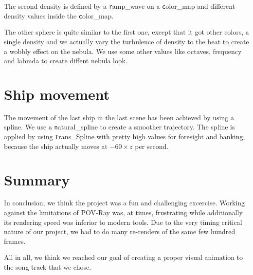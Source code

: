 \documentclass[a4paper, 12pt]{scrartcl}
\begin{document}
    The second density is defined by a \texttt ramp\_wave on a \texttt color\_map and different density
    values inside the \texttt color\_map.

    The other sphere is quite similar to the first one, except that it got other colors, a single
    density and we actually vary the turbulence of density to the beat to create a wobbly effect on
    the nebula.  We use some other values like octaves, frequency and labmda to create diffent
    nebula look.

    \section{Ship movement}
    \label{sec:spline}

    The movement of the last ship in the last scene has been achieved by using a spline. We use a
    \texttt natural\_spline to create a smoother trajectory. The spline is applied by using \texttt
    Trans\_Spline with pretty high values for foresight and banking, because the ship actually
    moves at \(-60 \times z\) per second.

    \section{Summary}

    In conclusion, we think the project was a fun and challenging excercise. Working against the
    limitations of POV-Ray was, at times, frustrating while additionally its rendering speed was
    inferior to modern tools. Due to the very timing critical nature of our project, we had to do
    many re-renders of the same few hundred frames.

    All in all, we think we reached our goal of creating a proper visual animation to the song
    track that we chose.
\end{document}
